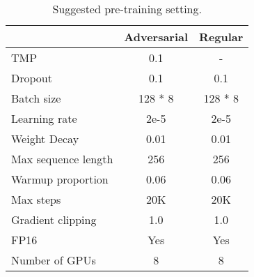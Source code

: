 \documentclass[letterpaper]{article} \usepackage{aaai23}  \usepackage{times}  \usepackage{helvet}  \usepackage{courier}  \usepackage[hyphens]{url}  \usepackage{graphicx} \urlstyle{rm} \def\UrlFont{\rm}  \usepackage{natbib}  \usepackage{caption} \frenchspacing  \setlength{\pdfpagewidth}{8.5in}  \setlength{\pdfpageheight}{11in}  \usepackage{algorithm}
\begin{document}
\begin{table}[H]
\centering
\small
\begin{tabular}{@{}lcc@{}}
\toprule
                          & Adversarial   & Regular        \\ \midrule
TMP                       & 0.1           & -              \\
Dropout                   & 0.1           & 0.1            \\
Batch size                & 128 * 8       & 128 * 8        \\
Learning rate             & 2e-5          & 2e-5           \\
Weight Decay              & 0.01          & 0.01           \\
Max sequence length       & 256           & 256            \\
Warmup proportion         & 0.06          & 0.06           \\
Max steps                 & 20K           & 20K            \\
Gradient clipping         & 1.0           & 1.0            \\
FP16                      & Yes           & Yes            \\
Number of GPUs            & 8             & 8              \\ \bottomrule
\end{tabular}
\caption{Suggested pre-training setting.}
\end{table}
\end{document}
